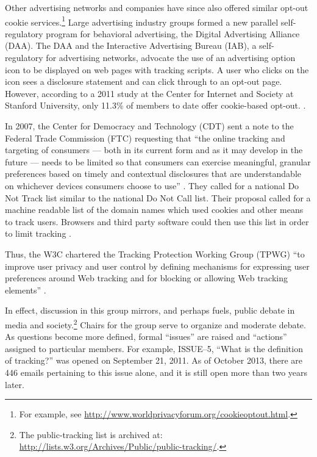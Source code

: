 Other advertising networks and companies have since also offered similar opt-out cookie  services.\footnote{For example, see \url{http://www.worldprivacyforum.org/cookieoptout.html}.}  Large advertising industry groups formed a new parallel self-regulatory program for behavioral advertising, the Digital Advertising Alliance (DAA). The DAA and the Interactive Advertising Bureau (IAB), a self-regulatory for advertising networks, advocate the use of an advertising option icon to be displayed on web pages with tracking scripts. A user who clicks on the icon sees a disclosure statement and can click through to an opt-out page. However, according to a 2011 study at the Center for Internet and Society at Stanford University, only 11.3\% of members to date offer cookie-based opt-out.  \citep{J:2011wm}. 

In 2007, the Center for Democracy and Technology (CDT) sent a note to the Federal Trade Commission (FTC) requesting that ``the online tracking and targeting of consumers --- both in its current form and as it may develop in the future --- needs to be limited so that consumers can exercise meaningful, granular preferences based on timely and contextual disclosures that are understandable on whichever devices consumers choose to use''  \citep{CenterforDemocracy:uc}.  They called for a national Do Not Track list similar to the national Do Not Call list. Their proposal called for a machine readable list of the domain names which used cookies and other means to track users. Browsers and third party software could then use this list in order to limit tracking  \citep{CenterforDemocracy:uc}. 

Thus, the W3C chartered the Tracking Protection Working Group (TPWG) ``to improve user privacy and user control by defining mechanisms for expressing user preferences around Web tracking and for blocking or allowing Web tracking elements''  \citep{Anonymous:vz}. 

In effect, discussion in this group mirrors, and perhaps fuels, public debate in media and society.\footnote{The public-tracking list is archived at:  \url{http://lists.w3.org/Archives/Public/public-tracking/}. } Chairs for the group serve to organize and moderate debate. As questions become more defined, formal ``issues'' are raised and ``actions'' assigned to particular members. For example, ISSUE--5, ``What is the definition of tracking?'' was opened on September 21, 2011. As of October 2013, there are 446 emails pertaining to this issue alone, and it is still open more than two years later. 

